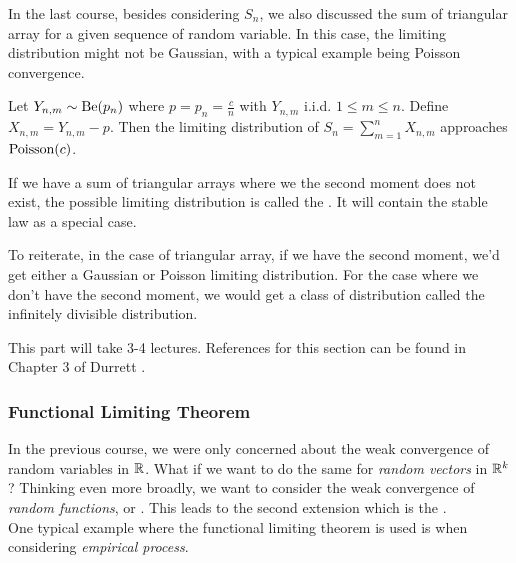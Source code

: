 \documentclass[../main/main.tex]{subfiles}
\begin{document}
In the last course, besides considering $S_n$, we also discussed the sum of triangular array for a given sequence of random variable. In this case, the limiting distribution might not be Gaussian, with a typical example being Poisson convergence.

\begin{example}
	Let $Y_{n,m} \sim \text{Be}(p_n)$ where $p = p_n = \frac{c}{n}$ with $Y_{n,m}$ i.i.d. $1 \leq m \leq n$. Define $X_{n,m} = Y_{n,m} - p$.
	Then the limiting distribution of $S_n = \sum\limits_{m=1}^{n}X_{n,m}$ approaches $\text{Poisson}(c)$.
\end{example}

If we have a sum of triangular arrays where we the second moment does not exist, the possible limiting distribution is called the . It will contain the stable law as a special case.

To reiterate, in the case of triangular array, if we have the second moment, we'd get either a Gaussian or Poisson limiting distribution. For the case where we don't have the second moment, we would get a class of distribution called the infinitely divisible distribution.\\

\begin{remark}
	\noindent This part will take 3-4 lectures. References for this section can be found in Chapter 3 of Durrett \cite{Durrett19}.
\end{remark}


\subsubsection{Functional Limiting Theorem}
In the previous course, we were only concerned about the weak convergence of random variables in $\mathbb{R}$. What if we want to do the same for \textit{random vectors} in $\mathbb{R}^{k}$? Thinking even more broadly, we want to consider the weak convergence of \textit{random functions}, or . This leads to the second extension which is the .\\

One typical example where the functional limiting theorem is used is when considering \textit{empirical process}.
\end{document}
